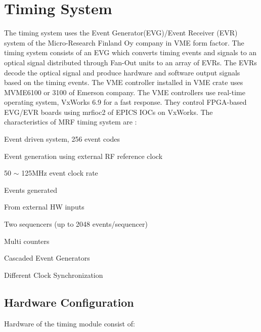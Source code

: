 \documentclass[a4paper,
              ]{jacow}
\begin{document}
\section{Timing System}
The timing system uses the Event Generator(EVG)/Event Receiver (EVR)\cite{mrf} system of the Micro-Research Finland Oy company in VME form factor. The timing system consists of an EVG which converts timing events and signals to an optical signal distributed through Fan-Out units to an array of EVRs. The EVRs decode the optical signal and produce hardware and software output signals based on the timing events. The VME controller installed in VME crate uses MVME6100 or 3100 of Emerson company. The VME controllers use real-time operating system, VxWorks 6.9 for a fast response. They control FPGA-based EVG/EVR boards using mrfioc2 of EPICS IOCs on VxWorks.
\hfil\break
The characteristics of MRF timing system are :
\begin{Itemize}
	\item Event driven system, 256 event codes
	\item Event generation using external RF reference clock
	\item 50 $\sim$  125MHz event clock rate
	\item Events generated
	\begin{Itemize}
		\item From external HW inputs
		\item Two sequencers (up to 2048 events/sequencer)
		\item Multi counters
	\end{Itemize}
	\item Cascaded Event Generators
	\item Different Clock Synchronization
\end{Itemize}

\subsection{Hardware Configuration}

Hardware of the timing module consist of:
\end{document}
